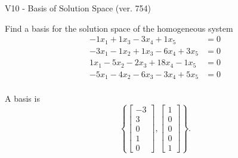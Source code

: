 \begin{exercise}
  \begin{exerciseTitle}V10 - Basis of Solution Space (ver. 754)\end{exerciseTitle}
  \begin{exerciseStatement}
    Find a basis for the solution space of the homogeneous system 
\begin{align*}
 -1 x_ 1 + 1 x_ 3 -3 x_ 4 + 1 x_ 5 &= 0  \\ 
  -3 x_ 1 -1 x_ 2 + 1 x_ 3 -6 x_ 4 + 3 x_ 5 &= 0  \\ 
  1 x_ 1 -5 x_ 2 -2 x_ 3 + 18 x_ 4 -1 x_ 5 &= 0  \\ 
  -5 x_ 1 -4 x_ 2 -6 x_ 3 -3 x_ 4 + 5 x_ 5 &= 0  \\ 
 \end{align*}


 
  \end{exerciseStatement}

  \begin{exerciseAnswer}
   A basis is   
\[\left\{\left[\begin{array}{c}
-3 \\
3 \\
0 \\
1 \\
0
\end{array}\right] , \left[\begin{array}{c}
1 \\
0 \\
0 \\
0 \\
1
\end{array}\right]\right\}.\]

  


  \end{exerciseAnswer}
\end{exercise}